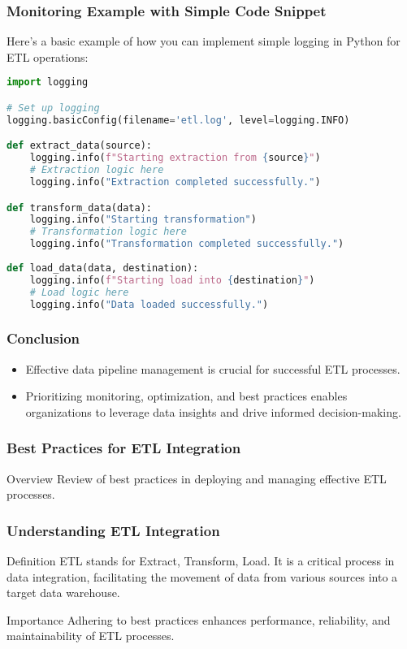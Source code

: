 \documentclass[aspectratio=169]{beamer}
\begin{document}
\begin{frame}[fragile]
    \frametitle{Monitoring Example with Simple Code Snippet}
    Here’s a basic example of how you can implement simple logging in 
    Python for ETL operations:
    \begin{lstlisting}[language=Python]
import logging

# Set up logging
logging.basicConfig(filename='etl.log', level=logging.INFO)

def extract_data(source):
    logging.info(f"Starting extraction from {source}")
    # Extraction logic here
    logging.info("Extraction completed successfully.")

def transform_data(data):
    logging.info("Starting transformation")
    # Transformation logic here
    logging.info("Transformation completed successfully.")
    
def load_data(data, destination):
    logging.info(f"Starting load into {destination}")
    # Load logic here
    logging.info("Data loaded successfully.")
    \end{lstlisting}
\end{frame}

\begin{frame}[fragile]
    \frametitle{Conclusion}
    \begin{itemize}
        \item Effective data pipeline management is crucial for successful 
        ETL processes.
        \item Prioritizing monitoring, optimization, and best practices 
        enables organizations to leverage data insights and drive informed 
        decision-making.
    \end{itemize}
\end{frame}

\begin{frame}[fragile]
    \frametitle{Best Practices for ETL Integration}
    \begin{block}{Overview}
        Review of best practices in deploying and managing effective ETL processes.
    \end{block}
\end{frame}

\begin{frame}[fragile]
    \frametitle{Understanding ETL Integration}
    \begin{block}{Definition}
        ETL stands for Extract, Transform, Load. It is a critical process in data integration, facilitating the movement of data from various sources into a target data warehouse.
    \end{block}
    \begin{block}{Importance}
        Adhering to best practices enhances performance, reliability, and maintainability of ETL processes.
    \end{block}
\end{frame}
\end{document}
